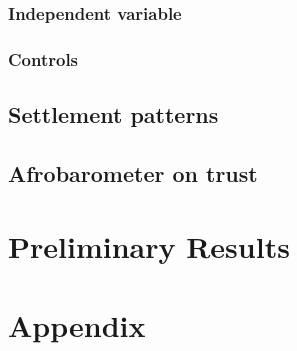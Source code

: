 \documentclass[12pt]{article}
\begin{document}
\subsubsection{Independent variable}
\subsubsection{Controls}

\subsection{Settlement patterns}

\subsection{Afrobarometer on trust}

\section{Preliminary Results}





\section{Appendix}
\end{document}
